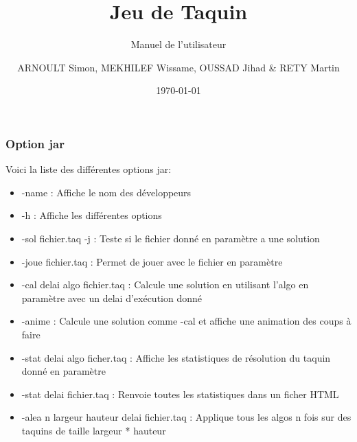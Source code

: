 \documentclass{beamer}
\title{Jeu de Taquin}
\subtitle{Manuel de l'utilisateur}
\author{ARNOULT Simon, MEKHILEF Wissame, OUSSAD Jihad \& RETY Martin}
\institute{Université d'Orléans}
\date{\today}
\begin{document}
  \begin{frame}
   \titlepage
  \end{frame}

  \begin{frame}
   \frametitle{Option jar}
	Voici la liste des différentes options jar:
	\begin{itemize}
	\item -name : Affiche le nom des développeurs
	\item -h : Affiche les différentes options
	\item -sol fichier.taq -j : Teste si le fichier donné en paramètre a une solution
	\item -joue fichier.taq : Permet de jouer avec le fichier en paramètre
	\item -cal delai algo fichier.taq : Calcule une solution en utilisant l'algo en paramètre avec un delai d'exécution donné
	\item -anime : Calcule une solution comme -cal et affiche une animation des coups à faire
	\item -stat delai algo ficher.taq : Affiche les statistiques de résolution du taquin donné en paramètre
	\item -stat delai fichier.taq : Renvoie toutes les statistiques dans un ficher HTML
	\item -alea n largeur hauteur delai fichier.taq : Applique tous les algos n fois sur des taquins de taille largeur * hauteur
	\end{itemize}
   \end{frame}
   
\end{document}
